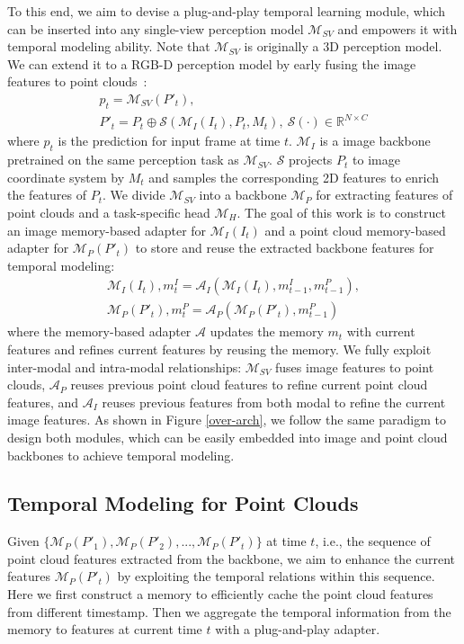 To this end, we aim to devise a plug-and-play temporal learning module, which can be inserted into any single-view perception model $\mathcal{M}_{SV}$ and empowers it with temporal modeling ability. 
Note that $\mathcal{M}_{SV}$ is originally a 3D perception model. We can extend it to a RGB-D perception model by early fusing the image features to point clouds~\cite{rukhovich2023tr3d}:
\begin{gather}
    p_t=\mathcal{M}_{SV}(P'_t), \nonumber \\
    P'_t=P_t\oplus \mathcal{S}(\mathcal{M}_I(I_t),P_t,M_t),\ \mathcal{S}(\cdot)\in \mathbb{R}^{N\times C}
\end{gather}
where $p_t$ is the prediction for input frame at time $t$. $\mathcal{M}_I$ is a image backbone pretrained on the same perception task as $\mathcal{M}_{SV}$. $\mathcal{S}$ projects $P_t$ to image coordinate system by $M_t$ and samples the corresponding 2D features to enrich the features of $P_t$.
We divide $\mathcal{M}_{SV}$ into a backbone $\mathcal{M}_{P}$ for extracting features of point clouds and a task-specific head $\mathcal{M}_{H}$. The goal of this work is to construct an image memory-based adapter for $\mathcal{M}_I(I_t)$ and a point cloud memory-based adapter for $\mathcal{M}_{P}(P'_t)$ to store and reuse the extracted backbone features for temporal modeling:
\begin{gather}
    \mathcal{M}_{I}(I_t),m^I_t=\mathcal{A}_I(\mathcal{M}_{I}(I_t),m^I_{t-1},m^P_{t-1}), \nonumber \\
    \mathcal{M}_{P}(P'_t),m^P_t=\mathcal{A}_P(\mathcal{M}_{P}(P'_t),m^P_{t-1})
\end{gather}
where the memory-based adapter $\mathcal{A}$ updates the memory $m_t$ with current features and refines current features by reusing the memory. 
We fully exploit inter-modal and intra-modal relationships: $\mathcal{M}_{SV}$ fuses image features to point clouds, $\mathcal{A}_P$ reuses previous point cloud features to refine current point cloud features, and $\mathcal{A}_I$ reuses previous features from both modal to refine the current image features.
As shown in Figure \ref{over-arch}, we follow the same paradigm to design both modules, which can be easily embedded into image and point cloud backbones to achieve temporal modeling.

\subsection{Temporal Modeling for Point Clouds}
Given $\{\mathcal{M}_{P}(P'_{1}),\mathcal{M}_{P}(P'_{2}),...,\mathcal{M}_{P}(P'_{t})\}$ at time $t$, i.e., the sequence of point cloud features extracted from the backbone, we aim to enhance the current features $\mathcal{M}_{P}(P'_{t})$ by exploiting the temporal relations within this sequence. Here we first construct a memory to efficiently cache the point cloud features from different timestamp. Then we aggregate the temporal information from the memory to features at current time $t$ with a plug-and-play adapter.

